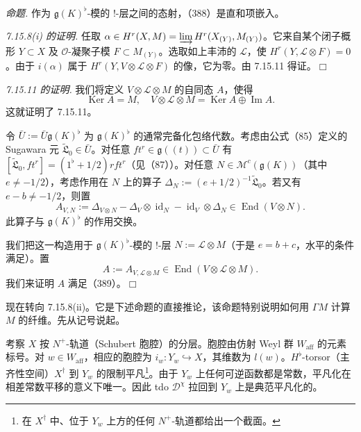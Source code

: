  \emph{命题.} 作为 $\mathfrak{g}(K)^{\flat}$-模的 !-层之间的态射，（388）是直和项嵌入。

 \emph{7.15.8(i) 的证明.} 任取 $\alpha\in H^{r}(X,M)=\varinjlim H^{r}(X_{(Y)},M_{(Y)})$。它来自某个闭子概形 $Y\subset X$ 及 $\mathcal{O}$-凝聚子模 $F\subset M_{(Y)}$。选取如上丰沛的 $\mathcal{L}$，使 $H^{r}(Y,\mathcal{L}\otimes F)=0$。由于 $i(\alpha)$ 属于 $H^{r}(Y,V\otimes\mathcal{L}\otimes F)$ 的像，它为零。由 7.15.11 得证。\hfill$\Box$

 \emph{7.15.11 的证明.} 我们将定义 $V\otimes\mathcal{L}\otimes M$ 的自同态 $A$，使得
\begin{equation}\tag{389}
\operatorname{Ker}A=M,\quad V\otimes\mathcal{L}\otimes M=\operatorname{Ker}A\oplus\operatorname{Im}A.
\end{equation}
这就证明了 7.15.11。

令 $\bar U:=\bar U\mathfrak{g}(K)^{\flat}$ 为 $\mathfrak{g}(K)^{\flat}$ 的通常完备化包络代数。考虑由公式（85）定义的 Sugawara 元 $\widetilde{\mathfrak{L}}_0\in\bar U$。对任意 $ft^{r}\in\mathfrak{g}((t))\subset\bar U$ 有 $[\widetilde{\mathfrak{L}}_0,ft^{r}]=(1^{\flat}+1/2)rft^{r}$（见（87））。对任意%
$N\in\mathcal{M}^{c}(\mathfrak{g}(K))$（其中 $e\ne-1/2$），考虑作用在 $N$ 上的算子 $\Delta_N:=(e+1/2)^{-1}\widetilde{\mathfrak{L}}_0$。若又有 $e-b\ne-1/2$，则置
\begin{equation}\tag{390}
A_{V,N}:=\Delta_{V\otimes N}-\Delta_V\otimes\operatorname{id}_N-\operatorname{id}_V\otimes\Delta_N\in\operatorname{End}(V\otimes N).
\end{equation}
此算子与 $\mathfrak{g}(K)^{\flat}$ 的作用交换。

我们把这一构造用于 $\mathfrak{g}(K)^{\flat}$-模的 !-层 $N:=\mathcal{L}\otimes M$（于是 $e=b+c$，水平的条件满足）。置
\begin{equation}\tag{391}
A:=A_{V,\mathcal{L}\otimes M}\in\operatorname{End}(V\otimes\mathcal{L}\otimes M).
\end{equation}
我们来证明 $A$ 满足（389）。\hfill$\Box$

 现在转向 7.15.8(ii)。它是下述命题的直接推论，该命题特别说明如何用 $\Gamma M$ 计算 $M$ 的纤维。先从记号说起。

考察 $X$ 按 $N^{+}$-轨道（Schubert 胞腔）的分层。胞腔由仿射 Weyl 群 $W_{\mathrm{aff}}$ 的元素标号。对 $w\in W_{\mathrm{aff}}$，相应的胞腔为 $i_w:Y_w\hookrightarrow X$，其维数为 $l(w)$。$H^{\flat}$-torsor（主齐性空间）$X^{\dagger}$ 到 $Y_w$ 的限制平凡\footnote{在 $X^{\dagger}$ 中、位于 $Y_w$ 上方的任何 $N^{+}$-轨道都给出一个截面。}。由于 $Y_w$ 上任何可逆函数都是常数，平凡化在相差常数平移的意义下唯一。因此 tdo $\mathcal{D}^{\chi}$ 拉回到 $Y_w$ 上是典范平凡化的。

